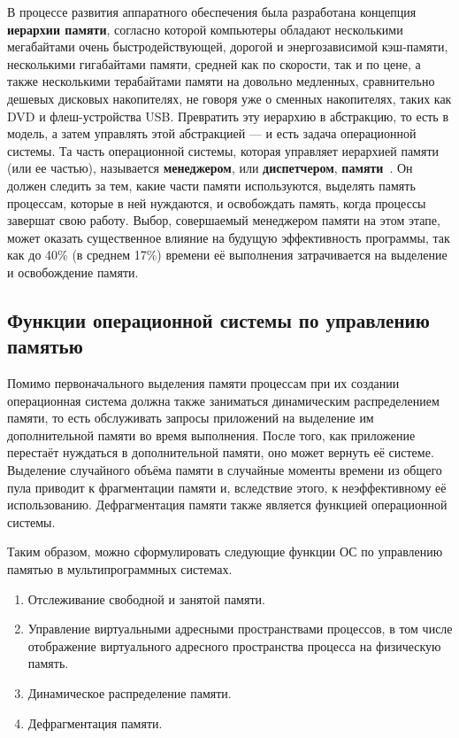 В процессе развития аппаратного обеспечения была разработана концепция \textbf{иерархии памяти}, согласно которой компьютеры обладают несколькими мегабайтами очень быстродействующей, дорогой и энергозависимой кэш-памяти, несколькими гигабайтами памяти, средней как по скорости, так и по цене, а также несколькими терабайтами памяти на довольно медленных, сравнительно дешевых дисковых накопителях, не говоря уже о сменных накопителях, таких как DVD и флеш-устройства USB. Превратить эту иерархию в абстракцию, то есть в модель, а затем управлять этой абстракцией --- и есть задача операционной системы. Та часть операционной системы, которая управляет иерархией памяти (или ее частью), называется \textbf{менеджером}, или \textbf{диспетчером}, \textbf{памяти}~\cite{tannenbaum}. Он должен следить за тем, какие части памяти используются, выделять память процессам, которые в ней нуждаются, и освобождать память, когда процессы завершат свою работу. Выбор, совершаемый менеджером памяти на этом этапе, может оказать существенное влияние на будущую эффективность программы, так как до 40\% (в среднем 17\%) времени её выполнения затрачивается на выделение и освобождение памяти.~\cite{cornell}

\subsection*{Функции операционной системы по управлению памятью}

Помимо первоначального выделения памяти процессам при их создании операционная система должна также заниматься динамическим распределением памяти, то есть обслуживать запросы приложений на выделение им дополнительной памяти во время выполнения. После того, как приложение перестаёт нуждаться в дополнительной памяти, оно может вернуть её системе. Выделение случайного объёма памяти в случайные моменты времени из общего пула приводит к фрагментации памяти и, вследствие этого, к неэффективному её использованию. Дефрагментация памяти также является функцией операционной системы.

Таким образом, можно сформулировать следующие функции ОС по управлению памятью в мультипрограммных системах.

\begin{enumerate}[label*=\arabic*.]
	\item Отслеживание свободной и занятой памяти.
	\item Управление виртуальными адресными пространствами процессов, в том числе отображение виртуального адресного пространства процесса на физическую память.
	\item Динамическое распределение памяти. 
	\item Дефрагментация памяти. 
\end{enumerate}


